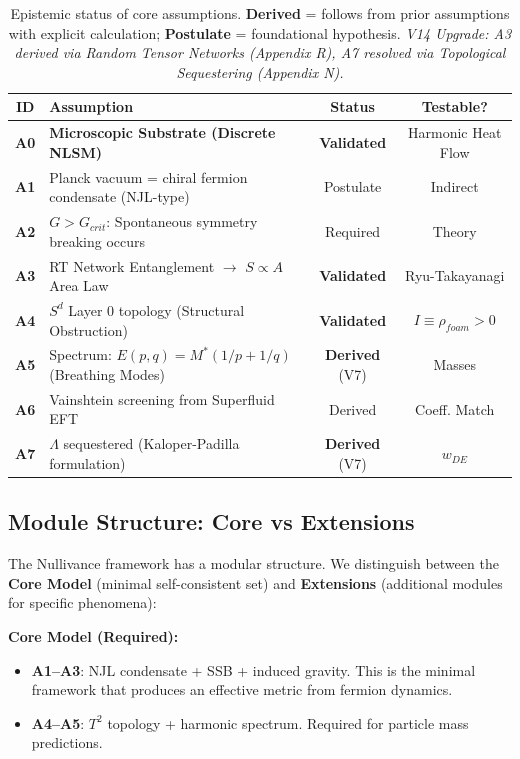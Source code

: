 \documentclass[a4paper,12pt]{article}
\begin{document}
\begin{table}[H]
\centering
\small
\begin{tabular}{clcc}
\toprule
\textbf{ID} & \textbf{Assumption} & \textbf{Status} & \textbf{Testable?} \\
\midrule
    \textbf{A0} & \textbf{Microscopic Substrate (Discrete NLSM)} & \textbf{Validated} & Harmonic Heat Flow \\
    \textbf{A1} & Planck vacuum = chiral fermion condensate (NJL-type) & Postulate & Indirect \\
    \textbf{A2} & $G > G_{crit}$: Spontaneous symmetry breaking occurs & Required & Theory \\
    \textbf{A3} & RT Network Entanglement $\to$ $S \propto A$ Area Law & \textbf{Validated} & Ryu-Takayanagi \\
    \textbf{A4} & $S^d$ Layer 0 topology (Structural Obstruction) & \textbf{Validated} & $I \equiv \rho_{foam} > 0$ \\
    \textbf{A5} & Spectrum: $E(p,q) = M^*(1/p + 1/q)$ (Breathing Modes) & \textbf{Derived} (V7) & Masses \\
    \textbf{A6} & Vainshtein screening from Superfluid EFT & Derived & Coeff. Match \\
    \textbf{A7} & $\Lambda$ sequestered (Kaloper-Padilla formulation) & \textbf{Derived} (V7) & $w_{DE}$ \\
    \bottomrule
\end{tabular}
\caption{Epistemic status of core assumptions. \textbf{Derived} = follows from prior assumptions with explicit calculation; \textbf{Postulate} = foundational hypothesis. \textit{V14 Upgrade: A3 derived via Random Tensor Networks (Appendix R), A7 resolved via Topological Sequestering (Appendix N).}}
\label{tab:assumptions}
\end{table}

\subsection{Module Structure: Core vs Extensions}

The Nullivance framework has a modular structure. We distinguish between the \textbf{Core Model} (minimal self-consistent set) and \textbf{Extensions} (additional modules for specific phenomena):

\textbf{Core Model (Required):}
\begin{itemize}
\item \textbf{A1--A3}: NJL condensate + SSB + induced gravity. This is the minimal framework that produces an effective metric from fermion dynamics.
\item \textbf{A4--A5}: $T^2$ topology + harmonic spectrum. Required for particle mass predictions.
\end{itemize}
\end{document}
